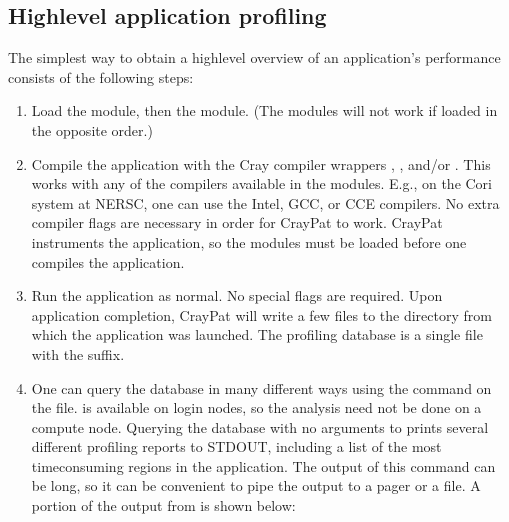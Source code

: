 \documentclass[letterpaper,10pt,english]{sphinxmanual}
\begin{document}
\subsection{High\sphinxhyphen{}level application profiling}
\label{\detokenize{External_Profiling_Tools:high-level-application-profiling}}
\sphinxAtStartPar
The simplest way to obtain a high\sphinxhyphen{}level overview of an application’s
performance consists of the following steps:
\begin{enumerate}
%
\item {} 
\sphinxAtStartPar
Load the  module, then the  module. (The
modules will not work if loaded in the opposite order.)

\item {} 
\sphinxAtStartPar
Compile the application with the Cray compiler wrappers , ,
and/or . This works with any of the compilers available in the
 modules. E.g., on the Cori system at NERSC, one can use the
Intel, GCC, or CCE compilers. No extra compiler flags are necessary in order
for CrayPat to work. CrayPat instruments the application, so the
 modules must be loaded before one compiles the application.

\item {} 
\sphinxAtStartPar
Run the application as normal. No special flags are required. Upon
application completion, CrayPat will write a few files to the directory from
which the application was launched. The profiling database is a single file
with the  suffix.

\item {} 
\sphinxAtStartPar
One can query the database in many different ways using the 
command on the  file.  is available on login nodes, so
the analysis need not be done on a compute node.  Querying the database with
no arguments to  prints several different profiling reports to
STDOUT, including a list of the most time\sphinxhyphen{}consuming regions in the
application. The output of this command can be long, so it can be convenient
to pipe the output to a pager or a file. A portion of the output from
 is shown below:


\end{enumerate}
\end{document}
